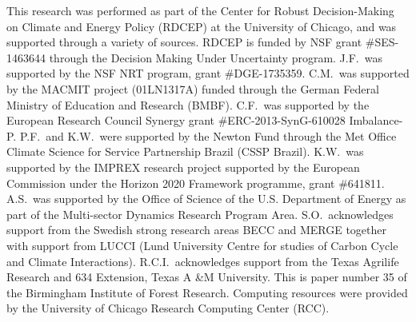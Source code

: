 \documentclass[gmd, manuscript]{copernicus} %
\begin{document}


\begin{acknowledgements}
This research was performed as part of the Center for Robust Decision-Making on Climate and Energy Policy (RDCEP) at the University of Chicago, and was supported through a variety of sources. 
RDCEP is funded by NSF grant \#SES-1463644 through the Decision Making Under Uncertainty program. 
J.F.\ was supported by the NSF NRT program, grant \#DGE-1735359. 
C.M.\ was supported by the MACMIT project (01LN1317A) funded through the German Federal Ministry of Education and Research (BMBF). 
C.F.\ was supported by the European Research Council Synergy grant \#ERC-2013-SynG-610028 Imbalance-P. 
P.F.\ and K.W.\ were supported  by the Newton Fund through the Met Office Climate Science for Service Partnership Brazil (CSSP Brazil). 
K.W.\ was supported by the IMPREX research project supported by the European Commission under the Horizon 2020 Framework programme, grant \#641811. 
A.S.\ was supported by the Office of Science of the U.S. Department of Energy as part of the Multi-sector Dynamics Research Program Area. 
S.O.\ acknowledges support from the Swedish strong research areas BECC and MERGE together with support from LUCCI (Lund University Centre for studies of Carbon Cycle and Climate Interactions). 
R.C.I.\ acknowledges support from the Texas Agrilife Research and 634 Extension, Texas A \&M University. This is paper number 35 of the Birmingham Institute of Forest Research. Computing resources were provided by the University of Chicago Research Computing Center (RCC).
\end{acknowledgements}



\end{document}
